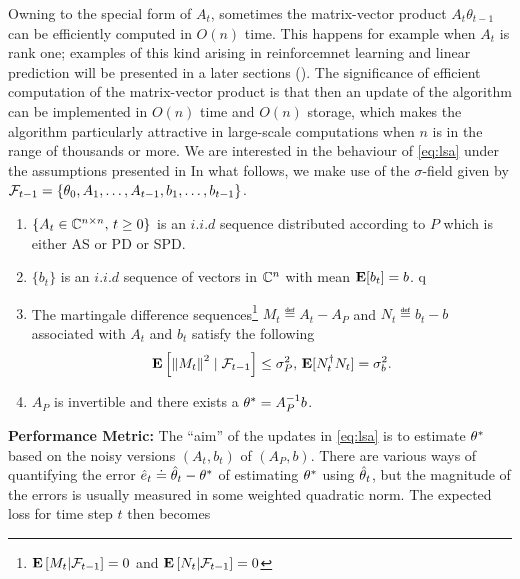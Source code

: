 Owning to the special form of $A_t$, sometimes the matrix-vector product $A_t \theta_{t-1}$
can be efficiently computed in $O(n)$ time.
This happens for example when $A_t$ is rank one; examples of this kind arising in reinforcemnet learning \cite{} and linear prediction \cite{} will be presented in a later sections (). The significance of efficient computation of the matrix-vector product is that then an update of the algorithm
can be implemented in $O(n)$ time and $O(n)$ storage, which makes the algorithm particularly attractive in large-scale computations when $n$ is in the range of thousands or more.
We are interested in the behaviour of \eqref{eq:lsa} under the assumptions presented in  In what follows, we make use of the $\sigma$-field given by $\mathcal{F}_{t-1}=\{\theta_0,A_1,\ldots, A_{t-1}, b_1,\ldots, b_{t-1}\}$.
\begin{assumption}\label{assmp:lsa}
\begin{enumerate}[leftmargin=*, before = \leavevmode\vspace{-\baselineskip}]
\item \label{dist} $\{A_t\in\mathbb{C}^{n\times n},\, t\geq 0\}$ is an $i.i.d$ sequence distributed according to $P$ which is either AS or PD or SPD.
\item $\{b_t\}$ is an $i.i.d$ sequence of vectors in $\mathbb{C}^n$ with mean $\mathbf{E}[b_t]=b$.
q\item \label{matvar} The martingale difference sequences\footnote{$\mathbf{E}\left[M_t|\mathcal{F}_{t-1}\right]=0$ and $\mathbf{E}\left[N_t|\mathcal{F}_{t-1}\right]=0$} $M_t\eqdef A_t-A_P$ and $N_t\eqdef b_t-b$ associated with $A_t$ and $b_t$ satisfy the following
\begin{align*}\mathbf{E}\left[ \left\| M_t\right\|^2\mid\mathcal{F}_{t-1}\right]\leq \sigma^2_P, \, \mathbf{E}[N_t^\dag N_t]=\sigma_b^2.\end{align*}
\item $A_P$ is invertible and there exists a $\theta^*=A_P^{-1}b$.
\end{enumerate}
\end{assumption}
\textbf{Performance Metric:}
The ``aim'' of the updates in \eqref{eq:lsa} is to estimate $\theta^*$ based on the noisy versions $(A_t,b_t)$ of $(A_P,b)$.
There are various ways of quantifying the error $\hat{e}_t \doteq \hat{\theta}_t- \theta^*$ of estimating $\theta^*$ using $\hat{\theta}_t$, but the magnitude
of the errors is usually measured in some weighted quadratic norm. The expected loss for time step $t$ then becomes
